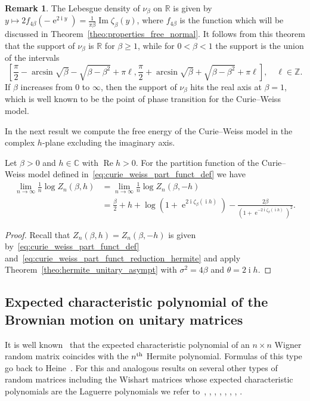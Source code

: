 \documentclass[10pt]{amsart}
\theoremstyle{definition}\newtheorem{defi}[theo]{Definition}\newtheorem{rema}[theo]{Remark}\newtheorem{exam}[theo]{Example}\newtheorem{exem}[theo]{Example}\newtheorem{nota}[theo]{Notation}
\DeclareMathOperator{\Ree}{Re}
\DeclareMathOperator{\Imm}{Im}
\DeclareMathOperator{\eee}{e}
\DeclareMathOperator{\ii}{i}
\newcommand{\R}{\mathbb{R}}
\newcommand{\C}{\mathbb{C}}
\newcommand{\Z}{\mathbb{Z}}
\begin{document}
\begin{rema}
The Lebesgue density of $\nu_\beta$ on $\R$ is given by $y\mapsto 2 f_{4\beta} (- \eee^{2\ii y}) = \frac{1}{\pi \beta} \Imm \zeta_\beta(y)$, where $f_{4\beta}$ is the function which will be discussed in Theorem~\ref{theo:properties_free_normal}. It follows from this theorem that the support of $\nu_\beta$ is $\R$ for $\beta \geq 1$, while for $0<\beta<1$ the support is the union of the intervals
\[
\left[\frac{\pi}{2} - \arcsin \sqrt \beta - \sqrt{\beta - \beta^2} + \pi \ell, \frac{\pi}{2} + \arcsin \sqrt \beta + \sqrt{\beta - \beta^2} + \pi \ell\right],
\quad
\ell\in \Z.
\]
If $\beta$ increases from $0$ to $\infty$, then the support of $\nu_\beta$ hits the real axis at $\beta=1$, which is well known to be the point of phase transition for the Curie--Weiss model.
\end{rema}

In the next result we compute the free energy of the Curie--Weiss model in the complex $h$-plane excluding the imaginary axis.

\begin{coro}\label{cor:curie_weiss_free_energy}
Let $\beta >0$ and $h\in \C$ with $\Ree h >0$. For the partition function of the Curie--Weiss model defined in~\eqref{eq:curie_weiss_part_funct_def} we have
\begin{align*}
\lim_{n\to\infty} \frac 1n \log Z_n(\beta, h) &=
\lim_{n\to\infty} \frac 1n \log Z_n(\beta, -h) \\
&=
\frac \beta 2 + h + \log \left(1+\eee^{2\ii \zeta_{\beta}(\ii h)}\right) - \frac{2\beta}{\left(1+ \eee^{-2 \ii \zeta_{\beta}(\ii h)}\right)^2}.
\end{align*}
\end{coro}
\begin{proof}
Recall that $Z_n(\beta, h) = Z_n(\beta, -h)$ is given by~\eqref{eq:curie_weiss_part_funct_def} and~\eqref{eq:curie_weiss_part_funct_reduction_hermite} and apply Theorem~\ref{theo:hermite_unitary_asympt} with $\sigma^2= 4\beta$ and $\theta = 2\ii h$.
\end{proof}

\subsection{Expected characteristic polynomial of the Brownian motion on unitary matrices} 

It is well known~\cite[Section~6.1.2]{potters_bouchaud_book} that the expected characteristic polynomial of an $n\times n$ Wigner random matrix coincides with the $n^{\text{\normalfont th}}$ Hermite polynomial. Formulas of this type go back to Heine~\cite[(2.2.11) p.~27]{szegoe_book}. For this and analogous results on several other types of random matrices including the Wishart matrices whose expected characteristic polynomials are the Laguerre polynomials we refer to~\cite[Sections~6.2, 6.3]{potters_bouchaud_book}, \cite{aomoto}, \cite[Chapter~9]{edelman_phd}, \cite[Theorem~4.1]{dumitriu_edelman}, \cite[(15)]{brezin_hikami}, \cite[Proposition~12]{diaconis_gamburd}, \cite[Proposition~11]{forrester_gamburd}, \cite[Theorem~1.1]{akemann_goetze_neuschel}.
\end{document}
